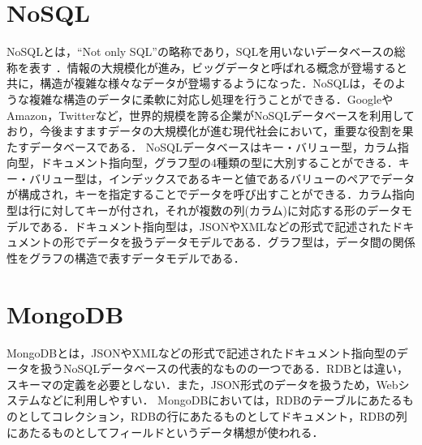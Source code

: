 \documentclass[a4paper,11pt]{ujreport}
\begin{document}
\section{NoSQL}
NoSQLとは，“Not only SQL”の略称であり，SQLを用いないデータベースの総称を表す \cite{太田201204}．情報の大規模化が進み，ビッグデータと呼ばれる概念が登場すると共に，構造が複雑な様々なデータが登場するようになった．NoSQLは，そのような複雑な構造のデータに柔軟に対応し処理を行うことができる．GoogleやAmazon，Twitterなど，世界的規模を誇る企業がNoSQLデータベースを利用しており，今後ますますデータの大規模化が進む現代社会において，重要な役割を果たすデータベースである\cite{太田201204}．
NoSQLデータベースはキー・バリュー型，カラム指向型，ドキュメント指向型，グラフ型の4種類の型に大別することができる．キー・バリュー型は，インデックスであるキーと値であるバリューのペアでデータが構成され，キーを指定することでデータを呼び出すことができる．カラム指向型は行に対してキーが付され，それが複数の列(カラム)に対応する形のデータモデルである．ドキュメント指向型は，JSONやXMLなどの形式で記述されたドキュメントの形でデータを扱うデータモデルである．グラフ型は，データ間の関係性をグラフの構造で表すデータモデルである\cite{太田201204}．

\section{MongoDB}
MongoDBとは，JSONやXMLなどの形式で記述されたドキュメント指向型のデータを扱うNoSQLデータベースの代表的なものの一つである．RDBとは違い，スキーマの定義を必要としない\cite{太田201204}\cite{mongodb}．また，JSON形式のデータを扱うため，Webシステムなどに利用しやすい．
MongoDBにおいては，RDBのテーブルにあたるものとしてコレクション，RDBの行にあたるものとしてドキュメント，RDBの列にあたるものとしてフィールドというデータ構想が使われる．
\end{document}
